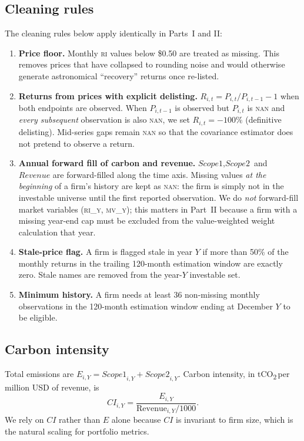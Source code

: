 \documentclass[11pt,a4paper]{article}
\begin{document}
\subsection{Cleaning rules}\label{sec:cleaning}
The cleaning rules below apply identically in Parts~I and II:

\begin{enumerate}[leftmargin=*]
  \item \textbf{Price floor.} Monthly \textsc{ri} values below \$0.50 are
        treated as missing. This removes prices that have collapsed to
        rounding noise and would otherwise generate astronomical
        ``recovery'' returns once re-listed.
  \item \textbf{Returns from prices with explicit delisting.}
        $R_{i,t}=P_{i,t}/P_{i,t-1}-1$ when both endpoints are observed.
        When $P_{i,t-1}$ is observed but $P_{i,t}$ is \textsc{nan} and
        \emph{every subsequent} observation is also \textsc{nan}, we set
        $R_{i,t}=-100\%$ (definitive delisting). Mid-series gaps remain
        \textsc{nan} so that the covariance estimator does not pretend to
        observe a return.
  \item \textbf{Annual forward fill of carbon and revenue.}
        $\textit{Scope1}, \textit{Scope2}$ and $\textit{Revenue}$ are
        forward-filled along the time axis. Missing values \emph{at the
        beginning} of a firm's history are kept as \textsc{nan}: the firm
        is simply not in the investable universe until the first reported
        observation. We do \emph{not} forward-fill market variables
        (\textsc{ri\_y, mv\_y}); this matters in Part~II because a firm
        with a missing year-end cap must be excluded from the
        value-weighted weight calculation that year.
  \item \textbf{Stale-price flag.} A firm is flagged stale in year $Y$ if
        more than 50\% of the monthly returns in the trailing 120-month
        estimation window are exactly zero. Stale names are removed from
        the year-$Y$ investable set.
  \item \textbf{Minimum history.} A firm needs at least 36 non-missing
        monthly observations in the 120-month estimation window ending at
        December $Y$ to be eligible.
\end{enumerate}

\subsection{Carbon intensity}
Total emissions are $E_{i,Y}=\textit{Scope1}_{i,Y}+\textit{Scope2}_{i,Y}$.
Carbon intensity, in \si{tCO_2}\,per\,million USD of revenue, is
\[
  CI_{i,Y}=\frac{E_{i,Y}}{\text{Revenue}_{i,Y}/1000}.
\]
We rely on $CI$ rather than $E$ alone because $CI$ is invariant to firm
size, which is the natural scaling for portfolio metrics.
\end{document}

